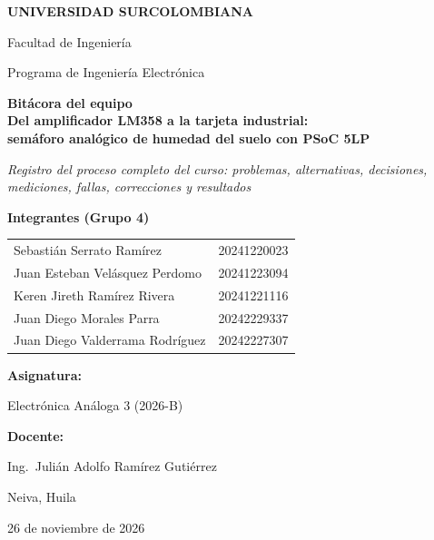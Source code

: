 \documentclass[11pt,a4paper]{article}
\newcommand{\fechaentrega}{26 de noviembre de 2026}
\newcommand{\asignatura}{Electrónica Análoga 3 (2026-B)}
\newcommand{\docente}{Ing.\ Julián Adolfo Ramírez Gutiérrez}
\begin{document}
\begin{titlepage}
  \thispagestyle{empty}\centering
  {\Large\bfseries UNIVERSIDAD SURCOLOMBIANA\par}\vspace{2pt}
  {\large Facultad de Ingeniería\par}{\large Programa de Ingeniería Electrónica\par}
  \vspace{1.5cm}{\color{usco}\rule{\linewidth}{1.2pt}\par}\vspace{0.5cm}
  {\LARGE\bfseries Bitácora del equipo\\[6pt]Del amplificador LM358 a la tarjeta industrial:\\semáforo analógico de humedad del suelo con PSoC 5LP\par}
  \vspace{0.4cm}
  {\large\itshape Registro del proceso completo del curso: problemas, alternativas, decisiones, mediciones, fallas, correcciones y resultados\par}
  \vspace{0.5cm}{\color{usco}\rule{\linewidth}{1.2pt}\par}
  \vspace{1.3cm}
  {\large\bfseries Integrantes (Grupo 4)\par}\vspace{0.3cm}
  \begin{tabular}{ll}
    Sebastián Serrato Ramírez        & 20241220023 \\
    Juan Esteban Velásquez Perdomo   & 20241223094 \\
    Keren Jireth Ramírez Rivera      & 20241221116 \\
    Juan Diego Morales Parra         & 20242229337 \\
    Juan Diego Valderrama Rodríguez  & 20242227307 \\
  \end{tabular}
  \vfill
  {\large\bfseries Asignatura:} {\large \asignatura\par}\vspace{0.2cm}
  {\large\bfseries Docente:} {\large \docente\par}\vspace{1.0cm}
  {\large Neiva, Huila\par}{\large \fechaentrega\par}
\end{titlepage}
\end{document}
